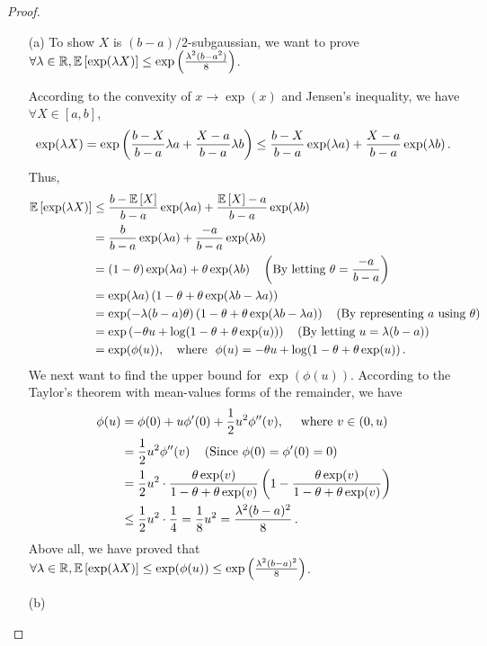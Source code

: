 \begin{proof}
\begin{enumerate}
	\item[(a)]To show $X$ is $(b-a)/2$-subgaussian, we want to prove $\forall \lambda \in \mathbb{R}, \mathbb{E} \left[\exp(\lambda X)\right] \le \exp\left( \frac{\lambda^2 (b-a^2)}{8} \right)$.

	According to the convexity of $x \to \exp(x)$ and Jensen's inequality, we have $\forall X \in [a,b]$,
	\begin{align*}
		\exp(\lambda X) = \exp\left( \frac{b-X}{b-a}\lambda a + \frac{X-a}{b-a}\lambda b \right) \le \frac{b-X}{b-a}\exp(\lambda a)+ \frac{X-a}{b-a}\exp(\lambda b)\,.
	\end{align*}
	Thus, 
	\begin{align*}
		\mathbb{E} \left[\exp(\lambda X)\right] &\le \frac{b-\mathbb{E} \left[X\right]}{b-a}\exp(\lambda a)+ \frac{\mathbb{E} \left[X\right]-a}{b-a}\exp(\lambda b) \\
		&= \frac{b}{b-a}\exp(\lambda a)+ \frac{-a}{b-a}\exp(\lambda b)\\
		&= (1-\theta)\exp(\lambda a)+\theta \exp(\lambda b) ~~~\left(\text{By letting $\theta = \frac{-a}{b-a}$}\right) \\
		&= \exp(\lambda a) \left(1-\theta+\theta \exp(\lambda b - \lambda a)\right) \\
		&= \exp(-\lambda(b-a)\theta) \left( 1-\theta+\theta \exp(\lambda b - \lambda a) \right) ~~~\left(\text{By representing $a$ using $\theta$}\right)\\
		&= \exp\left(-\theta u + \log(1-\theta+\theta\exp(u))\right) ~~~\left(\text{By letting $u=\lambda(b-a)$} \right) \\
		&= \exp(\phi(u)), ~~~\text{where}~~ \phi(u)=-\theta u + \log(1-\theta+\theta\exp(u))\,.
	\end{align*}
	We next want to find the upper bound for $\exp(\phi(u))$. According to the Taylor’s theorem with mean-values forms of the remainder, we have 
	\begin{align*}
		\phi(u) &= \phi(0) + u\phi'(0) + \frac{1}{2}u^2 \phi''(v),~~~~\text{where}~v \in (0,u)\\
		&= \frac{1}{2}u^2 \phi''(v) ~~~\left(\text{Since $\phi(0) = \phi'(0) = 0$}\right)\\
		&= \frac{1}{2}u^2 \cdot \frac{\theta \exp(v)}{1-\theta+\theta \exp(v)}\left(1-\frac{\theta \exp(v)}{1-\theta+\theta \exp(v)}\right) \\
		&\le \frac{1}{2}u^2 \cdot \frac{1}{4} =\frac{1}{8}u^2 = \frac{\lambda^2 (b-a)^2}{8}\,.
	\end{align*}
	Above all, we have proved that $\forall \lambda \in \mathbb{R}, \mathbb{E} \left[\exp(\lambda X)\right] \le \exp(\phi(u)) \le \exp\left(\frac{\lambda^2 (b-a)^2}{8}\right)$. 


	\item[(b)]
\end{enumerate}
\end{proof}



